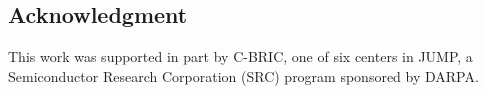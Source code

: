 \documentclass{elsarticle}
\begin{document}
\begin{multicols}{2}
	
	\section{Acknowledgment}
	This work was supported in part by C-BRIC, one of six centers in JUMP, a 
	Semiconductor Research Corporation (SRC) program sponsored by DARPA.
	
	
	
\end{multicols}
\end{document}
